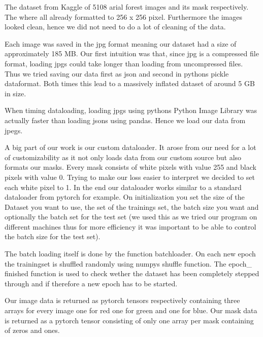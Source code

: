 The dataset from Kaggle of 5108 arial forest images and its mask 
respectively. The where all already formatted to 256 x 256 pixel. 
Furthermore the images looked clean, hence we did not need to do 
a lot of cleaning of the data.

Each image was saved in the jpg format meaning our 
dataset had a size of approximately 185 MB. 
Our first intuition was that, since jpg is a 
compressed file format, loading jpgs could take longer 
than loading from uncompressed files. Thus we tried saving our 
data first as json and second in pythons pickle dataformat. 
Both times this lead to a massively inflated dataset of 
around 5 GB in size.

When timing dataloading, loading jpgs using pythons 
Python Image Library was actually faster than loading jsons 
using pandas. Hence we load our data from jpegs.

A big part of our work is our custom dataloader. 
It arose from our need for a lot of customizability as it not 
only loads data from our custom source but also formats our masks.
 Every mask consists of white pixels with value 255 and black 
 pixels with value 0. Trying to make our loss easier to interpret 
 we decided to set each white pixel to 1.
In the end our dataloader works similar to a standard dataloader 
from pytorch for example. 
On initialization you set the size of the Dataset you want to 
use, the set of the trainings set, the batch size you want and 
optionally the batch set for the test set 
(we used this as we tried our program on different machines thus for 
more efficiency it was important to be able to control the batch size 
for the test set).

The batch loading itself is done by the function batchloader. 
On each new epoch the trainingset is shuffled randomly using numpys 
shuffle function. The epoch\_ finished function is used to check wether
 the dataset has been completely stepped through and if therefore a new 
 epoch has to be started.

Our image data is returned as pytorch tensors respectively containing 
three arrays for every image one for red one for green and one for blue.
 Our mask data is returned as a pytorch tensor consisting of only one
  array per mask containing of zeros and ones.